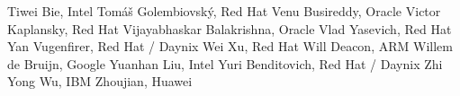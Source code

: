 Tiwei Bie,	Intel	\newline
Tomáš Golembiovský,	Red Hat	\newline
Venu Busireddy,	Oracle	\newline
Victor Kaplansky,	Red Hat	\newline
Vijayabhaskar Balakrishna,	Oracle	\newline
Vlad Yasevich,	Red Hat	\newline
Yan Vugenfirer, Red Hat / Daynix	\newline
Wei Xu,	Red Hat	\newline
Will Deacon,	ARM	\newline
Willem de Bruijn,	Google	\newline
Yuanhan Liu,	Intel	\newline
Yuri Benditovich,	Red Hat / Daynix	\newline
Zhi Yong Wu,	IBM	\newline
Zhoujian,	Huawei	\newline

